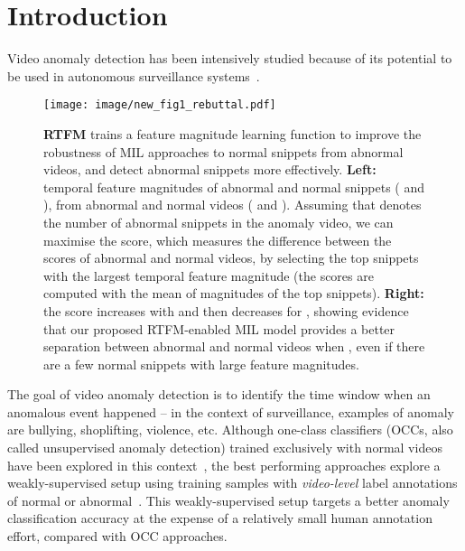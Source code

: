 \documentclass[10pt,twocolumn,letterpaper]{article}
\begin{document}
\section{Introduction}
Video anomaly detection has been intensively studied because of its potential to be used in autonomous surveillance systems~\cite{sultani2018real,hasan2016learning,Wu2020not,zhong2019graph}.
\begin{figure}[t]
\begin{center}
\small
  \texttt{[image: image/new\_fig1\_rebuttal.pdf]}
\end{center}
  \caption{\textbf{RTFM} trains a feature magnitude learning function to improve the robustness of MIL approaches to normal snippets from abnormal videos, and detect  abnormal snippets more effectively. \textbf{Left:} temporal feature magnitudes of abnormal and normal snippets ( and ), from abnormal and normal videos (\textcolor{red}{} and \textcolor{blue}{}). Assuming that  denotes the number of abnormal snippets in the anomaly video,  
  we can maximise the score, which measures the difference between the scores of abnormal and normal videos, by selecting the top  snippets with the largest temporal feature magnitude (the scores are computed with the mean of magnitudes of the top  snippets). \textbf{Right:}  the score increases with  and then decreases for , showing evidence that our proposed RTFM-enabled MIL model provides a better separation between abnormal and normal videos when , even if there are a few normal snippets with large feature magnitudes.}
\label{fig:intro}

\end{figure}
The goal of video anomaly detection is to identify the time window when an anomalous event happened -- in the context of surveillance, examples of anomaly are bullying, shoplifting, violence, etc. 
Although one-class classifiers (OCCs, also called unsupervised anomaly detection) trained exclusively with normal videos have been explored in this context~\cite{hasan2016learning,zhang2016video,ravanbakhsh2017abnormal,ravanbakhsh2018plug,luo2017revisit,liu2018future, hinami2017joint}, the best performing approaches explore  
a weakly-supervised setup using training samples with \textit{video-level} label annotations of normal or abnormal~\cite{Wu2020not,zhong2019graph,sultani2018real}. This weakly-supervised setup
targets a better anomaly classification accuracy at the expense of a relatively small human annotation effort, compared with OCC approaches.
\end{document}
